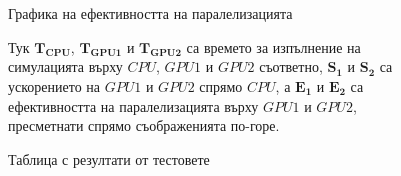 \documentclass[11pt, a4paper]{article}
\begin{document}
\begin{sloppypar}
\begin{figure}
\caption{Графика на ефективността на паралелизацията}
\label{fig:efficiency}
\centering
{}
\end{figure}



\begin{figure}
\caption{Таблица с резултати от тестовете \\ 
}
\label{fig:table}
\noindent{}
\begin{center}
	Тук $\bm{T_{CPU}}$, $\bm{T_{GPU1}}$ и $\bm{T_{GPU2}}$ са времето за изпълнение на симулацията върху $CPU$, $GPU1$ и $GPU2$ съответно, $\bm{S_1}$ и $\bm{S_2}$ са ускорението на $GPU1$ и $GPU2$ спрямо $CPU$, а $\bm{E_1}$ и $\bm{E_2}$ са ефективността на паралелизацията върху $GPU1$ и $GPU2$, пресметнати спрямо съображенията по-горе.
\end{center}
\end{figure}

\end{sloppypar}
\clearpage


\end{document}
